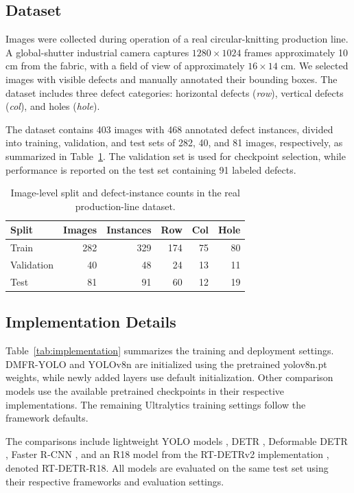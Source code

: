 \documentclass[journal]{IEEEtran}
\newcommand{\model}{DMFR-YOLO\xspace}
\begin{document}
\subsection{Dataset}
Images were collected during operation of a real circular-knitting production line. A global-shutter industrial camera captures $1280\times1024$ frames approximately 10 cm from the fabric, with a field of view of approximately $16\times14$ cm. We selected images with visible defects and manually annotated their bounding boxes. The dataset includes three defect categories: horizontal defects (\emph{row}), vertical defects (\emph{col}), and holes (\emph{hole}).

The dataset contains 403 images with 468 annotated defect instances, divided into training, validation, and test sets of 282, 40, and 81 images, respectively, as summarized in Table~\ref{tab:data}. The validation set is used for checkpoint selection, while performance is reported on the test set containing 91 labeled defects.
\begin{table}[!htbp]
\caption{Image-level split and defect-instance counts in the real production-line dataset.}
\label{tab:data}
\centering
\footnotesize
\begin{tabular}{lrrrrr}
\toprule
Split & Images & Instances & Row & Col & Hole \\
\midrule
Train & 282 & 329 & 174 & 75 & 80 \\
Validation & 40 & 48 & 24 & 13 & 11 \\
Test & 81 & 91 & 60 & 12 & 19 \\
\bottomrule
\end{tabular}
\end{table}

\subsection{Implementation Details}
\label{sec:implementation}
Table~\ref{tab:implementation} summarizes the training and deployment settings. \model and YOLOv8n are initialized using the pretrained yolov8n.pt weights, while newly added layers use default initialization. Other comparison models use the available pretrained checkpoints in their respective implementations. The remaining Ultralytics training settings follow the framework defaults.

The comparisons include lightweight YOLO models \cite{ultralytics2023,tian2025yolov12}, DETR \cite{carion2020detr}, Deformable DETR \cite{zhu2021deformable}, Faster R-CNN \cite{ren2015faster}, and an R18 model from the RT-DETRv2 implementation \cite{lv2024rtdetrv2}, denoted RT-DETR-R18. All models are evaluated on the same test set using their respective frameworks and evaluation settings.
\end{document}
